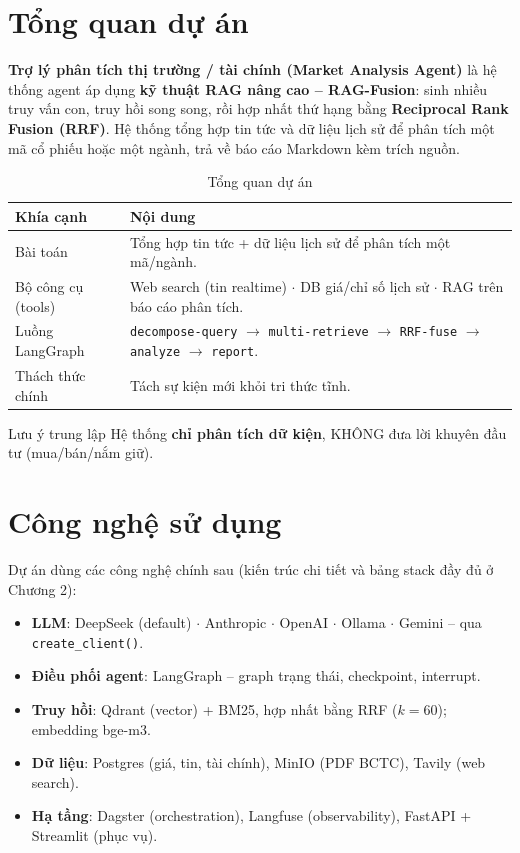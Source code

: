 \documentclass[12pt, a4paper]{report}
\begin{document}
\section{Tổng quan dự án}

\textbf{Trợ lý phân tích thị trường / tài chính (Market Analysis Agent)} là hệ thống agent áp dụng \textbf{kỹ thuật RAG nâng cao -- RAG-Fusion}: sinh nhiều truy vấn con, truy hồi song song, rồi hợp nhất thứ hạng bằng \textbf{Reciprocal Rank Fusion (RRF)}. Hệ thống tổng hợp tin tức và dữ liệu lịch sử để phân tích một mã cổ phiếu hoặc một ngành, trả về báo cáo Markdown kèm trích nguồn.

\begin{table}[H]
\centering
\caption{Tổng quan dự án}
\small
\begin{tabularx}{\textwidth}{lX}
\toprule
\textbf{Khía cạnh} & \textbf{Nội dung} \\
\midrule
Bài toán & Tổng hợp tin tức + dữ liệu lịch sử để phân tích một mã/ngành. \\
\rowcolor{rowgray}
Bộ công cụ (tools) & Web search (tin realtime) $\cdot$ DB giá/chỉ số lịch sử $\cdot$ RAG trên báo cáo phân tích. \\
Luồng LangGraph & \texttt{decompose-query} $\rightarrow$ \texttt{multi-retrieve} $\rightarrow$ \texttt{RRF-fuse} $\rightarrow$ \texttt{analyze} $\rightarrow$ \texttt{report}. \\
\rowcolor{rowgray}
Thách thức chính & Tách sự kiện mới khỏi tri thức tĩnh. \\
\bottomrule
\end{tabularx}
\end{table}

\begin{warnbox}{Lưu ý trung lập}
Hệ thống \textbf{chỉ phân tích dữ kiện}, KHÔNG đưa lời khuyên đầu tư (mua/bán/nắm giữ).
\end{warnbox}

\section{Công nghệ sử dụng}

Dự án dùng các công nghệ chính sau (kiến trúc chi tiết và bảng stack đầy đủ ở Chương 2):

\begin{itemize}
  \item \textbf{LLM}: DeepSeek (default) $\cdot$ Anthropic $\cdot$ OpenAI $\cdot$ Ollama $\cdot$ Gemini -- qua \texttt{create\_client()}.
  \item \textbf{Điều phối agent}: LangGraph -- graph trạng thái, checkpoint, interrupt.
  \item \textbf{Truy hồi}: Qdrant (vector) + BM25, hợp nhất bằng RRF ($k=60$); embedding bge-m3.
  \item \textbf{Dữ liệu}: Postgres (giá, tin, tài chính), MinIO (PDF BCTC), Tavily (web search).
  \item \textbf{Hạ tầng}: Dagster (orchestration), Langfuse (observability), FastAPI + Streamlit (phục vụ).
\end{itemize}
\end{document}
